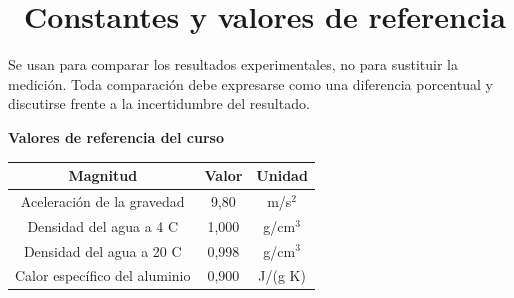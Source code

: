 \documentclass[11pt,a4paper]{article}
\newcommand{\iconotexto}[2]{\textcolor{cyanNeon}{\faIcon{#1}}~#2}
\begin{document}
\section{\iconotexto{paperclip}{Constantes y valores de referencia}}

Se usan para comparar los resultados experimentales, no para sustituir la medición. Toda comparación debe expresarse como una diferencia porcentual y discutirse frente a la incertidumbre del resultado.

\begin{center}
\begin{minipage}{\linewidth}
\centering
{\small
\textbf{Valores de referencia del curso}\par\smallskip
\begin{tabular}{@{}ccc@{}}
\toprule
Magnitud & Valor & Unidad \\
\midrule
Aceleración de la gravedad & 9,80 & m/s$^2$ \\
Densidad del agua a 4 C & 1,000 & g/cm$^3$ \\
Densidad del agua a 20 C & 0,998 & g/cm$^3$ \\
Calor específico del aluminio & 0,900 & J/(g K) \\
\bottomrule
\end{tabular}
}
\end{minipage}
\end{center}
\end{document}
